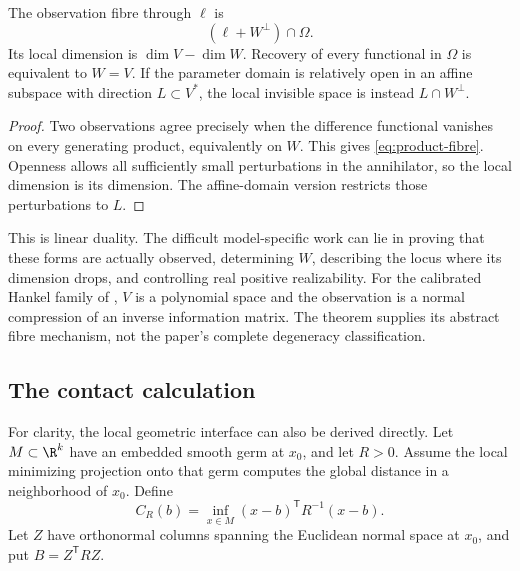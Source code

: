 \begin{theorem}\label{thm:product-fibre}
The observation fibre through $\ell$ is
\begin{equation}\label{eq:product-fibre}
 (\ell+W^\perp)\cap\Omega.
\end{equation}
Its local dimension is $\dim V-\dim W$. Recovery of every functional in
$\Omega$ is equivalent to $W=V$. If the parameter domain is relatively
open in an affine subspace with direction $L\subset V^*$, the local
invisible space is instead $L\cap W^\perp$.
\end{theorem}
\begin{proof}
Two observations agree precisely when the difference functional vanishes
on every generating product, equivalently on $W$. This gives
\eqref{eq:product-fibre}. Openness allows all sufficiently small
perturbations in the annihilator, so the local dimension is its dimension.
The affine-domain version restricts those perturbations to $L$.
\end{proof}

This is linear duality. The difficult model-specific work can lie in
proving that these forms are actually observed, determining $W$, describing
the locus where its dimension drops, and controlling real positive
realizability. For the calibrated Hankel family of \cite{QiA2},
$V$ is a polynomial space and the observation is a normal compression of an
inverse information matrix. The theorem supplies its abstract fibre
mechanism, not the paper's complete degeneracy classification.

\subsection{The contact calculation}
For clarity, the local geometric interface can also be derived directly.
Let $M\subset\R^k$ have an embedded smooth germ at $x_0$, and let $R>0$.
Assume the local minimizing projection onto that germ computes the global
distance in a neighborhood of $x_0$. Define
\[
 C_R(b)=\inf_{x\in M}(x-b)^{\mathsf T}R^{-1}(x-b).
\]
Let $Z$ have orthonormal columns spanning the Euclidean normal space at
$x_0$, and put $B=Z^{\mathsf T}RZ$.

